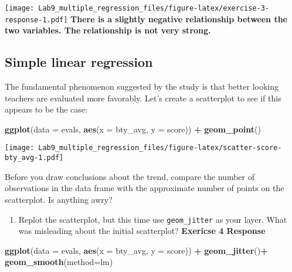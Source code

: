 \documentclass[
]{article}
\newenvironment{Shaded}{\begin{snugshade}}{\end{snugshade}}
\newcommand{\AttributeTok}[1]{\textcolor[rgb]{0.13,0.29,0.53}{#1}}
\newcommand{\FunctionTok}[1]{\textcolor[rgb]{0.13,0.29,0.53}{\textbf{#1}}}
\newcommand{\NormalTok}[1]{#1}
\newcommand{\SpecialCharTok}[1]{\textcolor[rgb]{0.81,0.36,0.00}{\textbf{#1}}}
\providecommand{\tightlist}{%
  \setlength{\itemsep}{0pt}\setlength{\parskip}{0pt}}
\begin{document}
\texttt{[image: Lab9\_multiple\_regression\_files/figure-latex/exercise-3-response-1.pdf]}
\textbf{There is a slightly negative relationship between the two
variables. The} \textbf{relationship is not very strong.}

\subsection{Simple linear regression}\label{simple-linear-regression}

The fundamental phenomenon suggested by the study is that better looking
teachers are evaluated more favorably. Let's create a scatterplot to see
if this appears to be the case:

\begin{Shaded}
\begin{Highlighting}[]
\FunctionTok{ggplot}\NormalTok{(}\AttributeTok{data =}\NormalTok{ evals, }\FunctionTok{aes}\NormalTok{(}\AttributeTok{x =}\NormalTok{ bty\_avg, }\AttributeTok{y =}\NormalTok{ score)) }\SpecialCharTok{+}
  \FunctionTok{geom\_point}\NormalTok{()}
\end{Highlighting}
\end{Shaded}

\texttt{[image: Lab9\_multiple\_regression\_files/figure-latex/scatter-score-bty\_avg-1.pdf]}

Before you draw conclusions about the trend, compare the number of
observations in the data frame with the approximate number of points on
the scatterplot. Is anything awry?

\begin{enumerate}
\def\labelenumi{\arabic{enumi}.}
\setcounter{enumi}{3}
\tightlist
\item
  Replot the scatterplot, but this time use \texttt{geom\_jitter} as
  your layer. What was misleading about the initial scatterplot?
  \textbf{Exericse 4 Response}
\end{enumerate}

\begin{Shaded}
\begin{Highlighting}[]
\FunctionTok{ggplot}\NormalTok{(}\AttributeTok{data =}\NormalTok{ evals, }\FunctionTok{aes}\NormalTok{(}\AttributeTok{x =}\NormalTok{ bty\_avg, }\AttributeTok{y =}\NormalTok{ score)) }\SpecialCharTok{+}
  \FunctionTok{geom\_jitter}\NormalTok{()}\SpecialCharTok{+}
  \FunctionTok{geom\_smooth}\NormalTok{(}\AttributeTok{method=}\NormalTok{lm)}
\end{Highlighting}
\end{Shaded}
\end{document}
